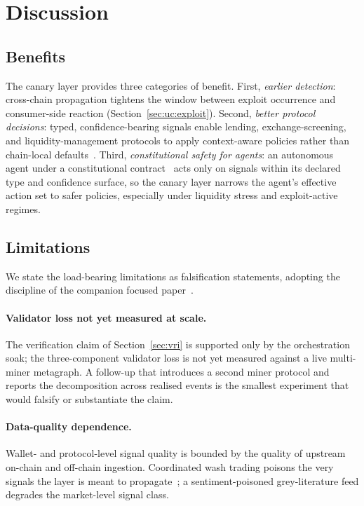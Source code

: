 \documentclass[journal]{IEEEtran}
\begin{document}
\section{Discussion}\label{sec:disc}

\subsection{Benefits}

The canary layer provides three categories of benefit. First,
\emph{earlier detection}: cross-chain propagation tightens the window
between exploit occurrence and consumer-side reaction
(Section~\ref{sec:uc:exploit}). Second, \emph{better protocol
decisions}: typed, confidence-bearing signals enable lending,
exchange-screening, and liquidity-management protocols to apply
context-aware policies rather than chain-local
defaults~\cite{HasanBB23}. Third, \emph{constitutional safety for
agents}: an autonomous agent under a constitutional
contract~\cite{bai2022constitutional} acts only on signals within its
declared type and confidence surface, so the canary layer narrows the
agent's effective action set to safer policies, especially under
liquidity stress and exploit-active regimes.

\subsection{Limitations}

We state the load-bearing limitations as falsification statements,
adopting the discipline of the companion focused
paper~\cite{magableh2026agenticiov}.

\paragraph*{Validator loss not yet measured at scale.}
The verification claim of Section~\ref{sec:vri} is supported only by
the orchestration soak; the three-component validator loss is not yet
measured against a live multi-miner metagraph. A follow-up that
introduces a second miner protocol and reports the decomposition
across realised events is the smallest experiment that would
falsify or substantiate the claim.

\paragraph*{Data-quality dependence.}
Wallet- and protocol-level signal quality is bounded by the quality of
upstream on-chain and off-chain ingestion. Coordinated wash trading
poisons the very signals the layer is meant to
propagate~\cite{cong2022crypto}; a sentiment-poisoned grey-literature
feed degrades the market-level signal class.
\end{document}
